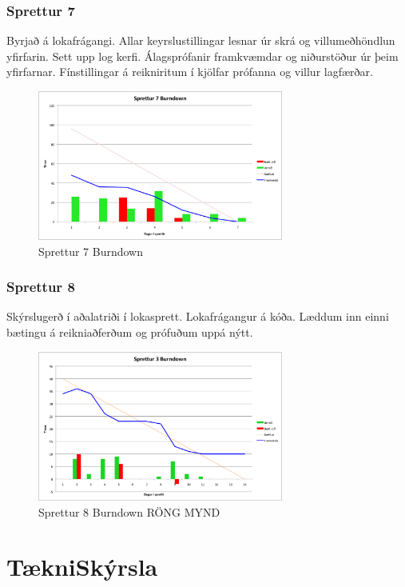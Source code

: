 \documentclass{article}
\begin{document}
\subsubsection{Sprettur 7}
Byrjað á lokafrágangi. Allar keyrslustillingar lesnar úr skrá og villumeðhöndlun
yfirfarin. Sett upp log kerfi. Álagsprófanir framkvæmdar og 
niðurstöður úr þeim yfirfarnar. Fínstillingar á reikniritum í kjölfar prófanna
og villur lagfærðar. 

\begin{figure}[H]
 \centering
 \includegraphics[width=0.72\textwidth]{Sprettur7_Burndown.png}
 \caption{Sprettur 7 Burndown}
\end{figure}

\subsubsection{Sprettur 8}
Skýrslugerð í aðalatriði í lokasprett. Lokafrágangur á kóða. Læddum inn einni
bætingu á reikniaðferðum og prófuðum uppá nýtt.
\begin{figure}[H]
 \centering
 \includegraphics[width=0.72\textwidth]{Sprettur3_Burndown.png}
 \caption{Sprettur 8 Burndown RÖNG MYND}
\end{figure}


\newpage


\section{TækniSkýrsla}
\end{document}
